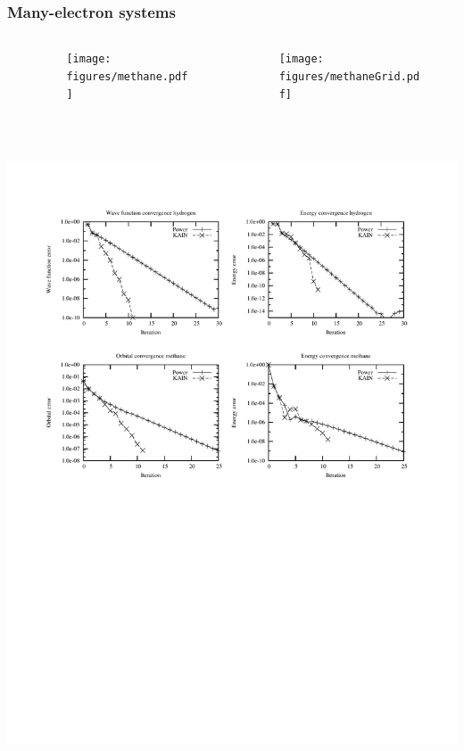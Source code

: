 \documentclass[mathserif, 10pt]{beamer}
\begin{document}
\begin{frame}
    \frametitle{Many-electron systems}
    \begin{columns}
    \begin{column}[b]{0.20\linewidth}
	\ \\
	\ \\
    \end{column}
    \begin{column}[b]{0.30\linewidth}
    \begin{figure}
	\centering
	\texttt{[image: figures/methane.pdf]}\\
	\ \\
	\ \\
    \end{figure}
    \end{column}
    \begin{column}[b]{0.50\linewidth}
    \begin{figure}
	\begin{center}
	\texttt{[image: figures/methaneGrid.pdf]}\\
	\end{center}
    \end{figure}
    \end{column}
    \end{columns}
    \begin{center}
	\includegraphics[scale=0.6, clip, viewport = 50 350 550 540]{figures/convergence.pdf}
    \end{center}
\end{frame}
\end{document}
